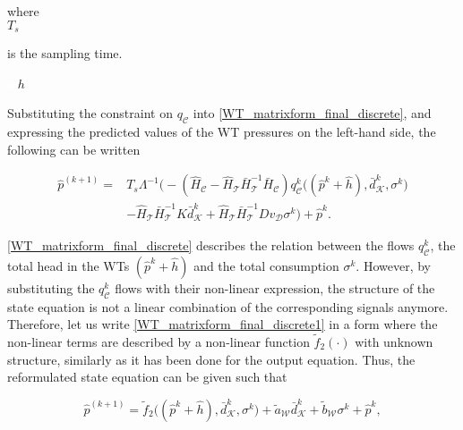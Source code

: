 \begin{minipage}[t]{0.20\textwidth}
where\\
\hspace*{8mm} $T_s$
\end{minipage}
\begin{minipage}[t]{0.68\textwidth}
\vspace*{2mm}
 is the sampling time.
\end{minipage}
\begin{minipage}[t]{0.10\textwidth}
\vspace*{2mm}
\textcolor{White}{te}$\unit{h}$
\end{minipage} 

Substituting the constraint on $q_{\mathcal{C}}$ into \eqref{WT_matrixform_final_discrete}, and expressing the predicted values of the WT pressures on the left-hand side, the following can be written

\vspace{-4mm}
\begin{align}
\label{WT_matrixform_final_discrete1}
\nonumber  \hat{p}^{(k+1)}  =& T_s \Lambda^{-1} \big(- (\hat{H}_{\mathcal{C}} - \hat{H}_{\mathcal{T}} \bar{H}^{-1}_{\mathcal{T}}\bar{H}_{\mathcal{C}})  q^{k}_{\mathcal{C}}\big ((\hat{p}^{k} + \hat{h}),\bar{d}^{k}_{\mathcal{K}}, \sigma^{k} \big) \\ & - \hat{H}_{\mathcal{T}} \bar{H}^{-1}_{\mathcal{T}} K \bar{d}^{k}_{\mathcal{K}} + \hat{H}_{\mathcal{T}} \bar{H}^{-1}_{\mathcal{T}} D v_{\mathcal{D}} \sigma^{k} \big) + \hat{p}^{k} .
\end{align}
\vspace{-4mm}


\eqref{WT_matrixform_final_discrete} describes the relation between the flows $q^{k}_{\mathcal{C}}$, the total head in the WTs $(\hat{p}^{k} + \hat{h})$ and the total consumption $\sigma^{k}$. However, by substituting the $q^{k}_{\mathcal{C}}$ flows with their non-linear expression, the structure of the state equation is not a linear combination of the corresponding signals anymore. Therefore, let us write \eqref{WT_matrixform_final_discrete1} in a form where the non-linear terms are described by a non-linear function $\tilde{f}_2(\cdot)$ with unknown structure, similarly as it has been done for the output equation. Thus, the reformulated state equation can be given such that

 \begin{equation}
  \label{WT_matrixform_final_discrete2}
     \hat{p}^{(k+1)}  = \tilde{f}_2 \big((\hat{p}^{k} + \hat{h}),\bar{d}^{k}_{\mathcal{K}}, \sigma^{k}\big) + \tilde{a}_{\mathcal{W}} \bar{d}^{k}_{\mathcal{K}} + \tilde{b}_{\mathcal{W}} \sigma^{k} + \hat{p}^{k},
\end{equation}

